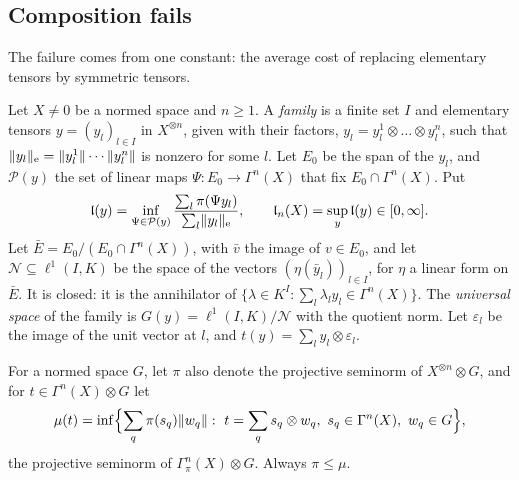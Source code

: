 \subsection{Composition fails}\label{amb:ssec:failure}

The failure comes from one constant: the average cost of replacing elementary tensors by symmetric tensors.

\begin{definition}\label{amb:def:polarization}
Let $X\ne0$ be a normed space and $n\ge1$. A \emph{family} is a finite set $I$ and elementary tensors $y=(y_l)_{l\in I}$ in $X^{\otimes n}$, given with their factors, $y_l=y_l^1\otimes\dots\otimes y_l^n$, such that $\lVert y_l\rVert_{\rm e}=\lVert y_l^1\rVert\cdots\lVert y_l^n\rVert$ is nonzero for some $l$. Let $E_0$ be the span of the $y_l$, and $\mathcal P(y)$ the set of linear maps $\Psi\colon E_0\to\Gamma^n(X)$ that fix $E_0\cap\Gamma^n(X)$. Put
\begin{equation}\label{amb:eq:lambda}
 \mathfrak l(y)=\inf_{\Psi\in\mathcal P(y)}\frac{\sum_l\pi(\Psi y_l)}{\sum_l\lVert y_l\rVert_{\rm e}},\qquad
 \mathfrak l_n(X)=\sup_y\mathfrak l(y)\in[0,\infty].
\end{equation}
Let $\bar E=E_0/(E_0\cap\Gamma^n(X))$, with $\bar v$ the image of $v\in E_0$, and let $\mathcal N\subseteq\ell^1(I,K)$ be the space of the vectors $(\eta(\bar y_l))_{l\in I}$, for $\eta$ a linear form on $\bar E$. It is closed: it is the annihilator of $\{\lambda\in K^I:\sum_l\lambda_ly_l\in\Gamma^n(X)\}$. The \emph{universal space} of the family is $G(y)=\ell^1(I,K)/\mathcal N$ with the quotient norm. Let $\varepsilon_l$ be the image of the unit vector at $l$, and $t(y)=\sum_ly_l\otimes\varepsilon_l$.

For a normed space $G$, let $\pi$ also denote the projective seminorm of $X^{\otimes n}\otimes G$, and for $t\in\Gamma^n(X)\otimes G$ let
\begin{equation}\label{amb:eq:mu}
 \mu(t)=\inf\Bigl\{\sum_q\pi(s_q)\norm{w_q}:\ t=\sum_qs_q\otimes w_q,\ s_q\in\Gamma^n(X),\ w_q\in G\Bigr\},
\end{equation}
the projective seminorm of $\Gamma^n_\pi(X)\otimes G$. Always $\pi\le\mu$.


\end{definition}
